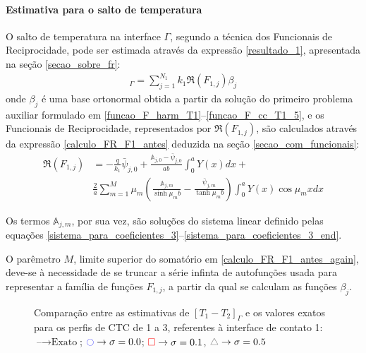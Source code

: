 \paragraph{Estimativa para o salto de temperatura}

O salto de temperatura na interface $\Gamma$, segundo a técnica dos Funcionais de Reciprocidade, pode ser estimada através da expressão \eqref{resultado_1}, apresentada na seção \ref{secao_sobre_fr}:
\begin{align}
[T_1 - T_2]_\Gamma = \sum_{j=1}^{N_1} k_1 \Re(F_{1,j}) \beta_j \label{resultado_1_again_2}
\end{align}
onde $\beta_j$ é uma base ortonormal obtida a partir da solução do primeiro problema auxiliar formulado em \eqref{funcao_F_harm_T1}--\eqref{funcao_F_cc_T1_5}, e os Funcionais de Reciprocidade, representados por $\Re(F_{1,j})$, são calculados através da expressão \eqref{calculo_FR_F1_antes} deduzida na seção \ref{secao_com_funcionais}:
\begin{align}
\Re(F_{1,j})
& =
-\frac{q}{k_1}\bar{\psi}_{j,0} + \frac{\mathbb{A}_{j,0} - \bar{\psi}_{j,0}}{ab}\int_0^a Y(x)dx + \nonumber \\
& \frac{2}{a}\sum_{m=1}^M \mu_m \left(\frac{\mathbb{A}_{j,m}}{\sinh\mu_m b} - \frac{\bar{\psi}_{j, m}}{\tanh\mu_m b}\right)\int_0^a Y(x)\cos\mu_m x dx
\label{calculo_FR_F1_antes_again}
\end{align}

Os termos $\mathbb{A}_{j,m}$, por sua vez, são soluções do sistema linear definido pelas equações \eqref{sistema_para_coeficientes_3}--\eqref{sistema_para_coeficientes_3_end}.

O parêmetro $M$, limite superior do somatório em \eqref{calculo_FR_F1_antes_again}, deve-se à necessidade de se truncar a série infinta de autofunções usada para representar a família de funções $F_{1,j}$, a partir da qual se calculam as funções $\beta_j$.


\begin{figure}[h!b]
	\caption{Comparação entre as estimativas de $[T_1 - T_2]_\Gamma$ e os valores exatos para os perfis de CTC de 1 a 3, referentes à interface de contato 1: $\text{--} \rightarrow \text{Exato}$; $\textcolor{blue}{\ocircle} \rightarrow \sigma = 0.0$; $\textcolor{red}{\square} \rightarrow \sigma = 0.1$, $\textcolor{gray}{\triangle} \rightarrow \sigma = 0.5$}
\end{figure}

